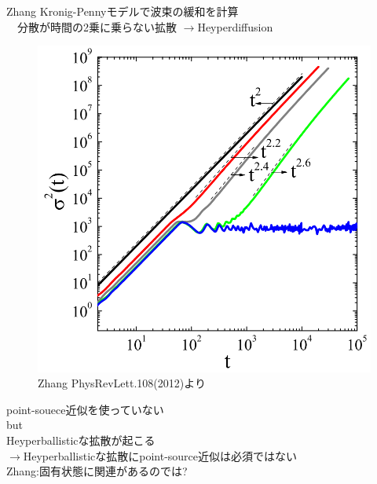 \documentclass[unicode, 12pt, aspectratio=169]{beamer}
\begin{document}
  \begin{frame}
     \begin{block}{Zhang}
      Kronig-Pennyモデルで波束の緩和を計算\\
    　分散が時間の2乗に乗らない拡散
      $\rightarrow$Heyperdiffusion
    \begin{figure}[h]
      \centering
      \includegraphics[width=70truemm]{figure_3.png}
      \caption{Zhang PhysRevLett.108(2012)より}
      \label{Zhang}
    \end{figure}
    point-souece近似を使っていない\\
    \alert{but}\\
    Heyperballisticな拡散が起こる\\
    $\rightarrow$Heyperballisticな拡散にpoint-source近似は必須ではない\\
       Zhang:固有状態に関連があるのでは?
    \end{block}
  \end{frame}
\end{document}
